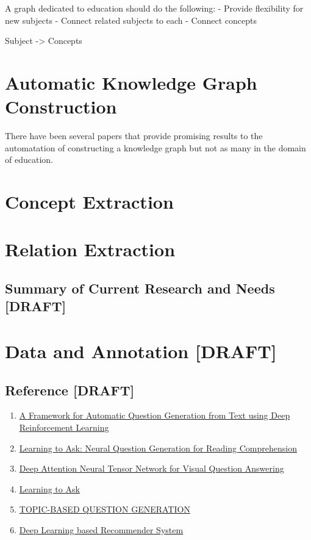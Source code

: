 \documentclass[]{book}
\theoremstyle{definition}
\theoremstyle{definition}
\theoremstyle{definition}
\theoremstyle{remark}
\begin{document}
A graph dedicated to education should do the following: - Provide
flexibility for new subjects - Connect related subjects to each -
Connect concepts

Subject -\textgreater{} Concepts

\section{Automatic Knowledge Graph
Construction}\label{automatic-knowledge-graph-construction-1}

There have been several papers that provide promising results to the
automatation of constructing a knowledge graph but not as many in the
domain of education.

\section{Concept Extraction}\label{concept-extraction}

\section{Relation Extraction}\label{relation-extraction}

\subsection{Summary of Current Research and Needs
{[}DRAFT{]}}\label{summary-of-current-research-and-needs-draft-1}

\section{Data and Annotation
{[}DRAFT{]}}\label{data-and-annotation-draft-1}

\subsection{Reference {[}DRAFT{]}}\label{reference-draft-1}

\begin{enumerate}
\def\labelenumi{\arabic{enumi}.}
\item
  \href{https://arxiv.org/pdf/1808.04961.pdf}{A Framework for Automatic
  Question Generation from Text using Deep Reinforcement Learning}
\item
  \href{https://arxiv.org/pdf/1705.00106.pdf}{Learning to Ask: Neural
  Question Generation for Reading Comprehension}
\item
  \href{http://openaccess.thecvf.com/content_ECCV_2018/papers/Yalong_Bai_Deep_Attention_Neural_ECCV_2018_paper.pdf}{Deep
  Attention Neural Tensor Network for Visual Question Answering}
\item
  \href{http://www.cs.cornell.edu/~xdu/papers/acl17_dsc_poster.pdf}{Learning
  to Ask}
\item
  \href{https://openreview.net/pdf?id=rk3pnae0b}{TOPIC-BASED QUESTION
  GENERATION}
\item
  \href{https://arxiv.org/pdf/1707.07435.pdf}{Deep Learning based
  Recommender System}
\end{enumerate}


\end{document}
